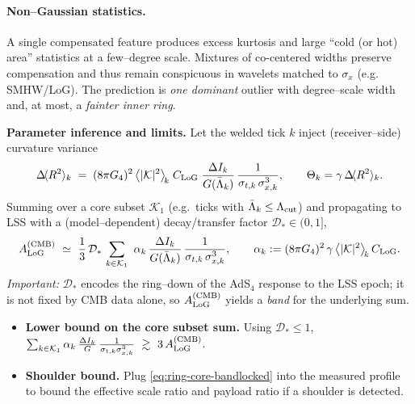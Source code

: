 \documentclass[10pt]{article}
\theoremstyle{definition}
\theoremstyle{plain}
\begin{document}
\paragraph{Non–Gaussian statistics.}\label{par:uom-main-167}
A single compensated feature produces excess kurtosis and large “cold (or hot) area” statistics at a
few–degree scale. Mixtures of co-centered widths preserve compensation and thus remain conspicuous in
wavelets matched to \(\sigma_x\) (e.g. SMHW/LoG). The prediction is \emph{one dominant} outlier with
degree–scale width and, at most, a \emph{fainter inner ring}.

\medskip
\noindent\textbf{Parameter inference and limits.}
Let the welded tick \(k\) inject (receiver–side) curvature variance
\[
\Delta\!\langle R^2\rangle_k
\;=\;(8\pi G_4)^2\,\big\langle|\mathcal K|^2\big\rangle_{\!k}\;
C_{\rm LoG}\;\frac{\Delta I_k}{G(\bar\Lambda_k)}\,\frac{1}{\sigma_{t,k}\,\sigma_{x,k}^{3}},
\qquad
\Theta_k=\gamma\,\Delta\!\langle R^2\rangle_k.
\]
Summing over a core subset $\mathcal K_1$ (e.g.\ ticks with $\bar\Lambda_k\le\Lambda_{\rm cut}$) and propagating to
LSS with a (model–dependent) decay/transfer factor \(\mathcal D_\ast\in(0,1]\),
\begin{equation}
\label{eq:A-LoG-CMB}
A_{\rm LoG}^{\rm (CMB)}\ \simeq\ \frac{1}{3}\,\mathcal D_\ast\,
\sum_{k\in\mathcal K_1}\ \alpha_k\,
\frac{\Delta I_k}{G(\bar\Lambda_k)}\,\frac{1}{\sigma_{t,k}\,\sigma_{x,k}^{3}},
\qquad
\alpha_k:=(8\pi G_4)^2\,\gamma\,\big\langle|\mathcal K|^2\big\rangle_{\!k}\,C_{\rm LoG}.
\end{equation}
\emph{Important:} \(\mathcal D_\ast\) encodes the ring–down of the AdS\(_4\) response to the LSS epoch; it is not fixed by CMB data alone, so \(A_{\rm LoG}^{\rm (CMB)}\) yields a \emph{band} for the underlying sum.

\begin{itemize}[leftmargin=1.6em,itemsep=2pt]
\item \textbf{Lower bound on the core subset sum.} Using \(\mathcal D_\ast\le 1\),
\(\sum_{k\in\mathcal K_1}\alpha_k\,\frac{\Delta I_k}{G}\,\frac{1}{\sigma_{t,k}\sigma_{x,k}^3}
\ \gtrsim\ 3\,A_{\rm LoG}^{\rm (CMB)}\).
\item \textbf{Shoulder bound.} Plug \eqref{eq:ring-core-bandlocked} into the measured profile to bound
the effective scale ratio and payload ratio if a shoulder is detected.
\end{itemize}
\end{document}
